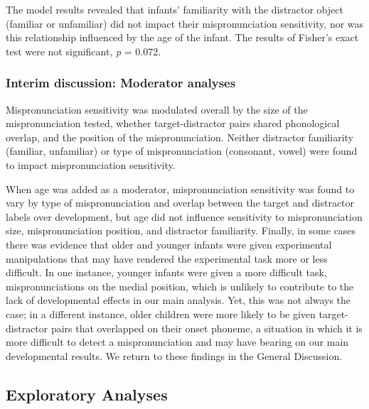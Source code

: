 \documentclass[
  english,
  man, noextraspace]{apa6}
\newenvironment{lltable}{\begin{landscape}\begin{center}\begin{ThreePartTable}}{\end{ThreePartTable}\end{center}\end{landscape}}
\begin{document}
\begin{lltable}
{}

\end{lltable}

The model results revealed that infants' familiarity with the distractor object (familiar or unfamiliar) did not impact their mispronunciation sensitivity, nor was this relationship influenced by the age of the infant. The results of Fisher's exact test were not significant, \emph{p} = 0.072.

\hypertarget{interim-discussion-moderator-analyses}{%
\subsubsection{Interim discussion: Moderator analyses}\label{interim-discussion-moderator-analyses}}

Mispronunciation sensitivity was modulated overall by the size of the mispronunciation tested, whether target-distractor pairs shared phonological overlap, and the position of the mispronunciation. Neither distractor familiarity (familiar, unfamiliar) or type of mispronunciation (consonant, vowel) were found to impact mispronunciation sensitivity.

When age was added as a moderator, mispronunciation sensitivity was found to vary by type of mispronunciation and overlap between the target and distractor labels over development, but age did not influence sensitivity to mispronunciation size, mispronunciation position, and distractor familiarity. Finally, in some cases there was evidence that older and younger infants were given experimental manipulations that may have rendered the experimental task more or less difficult. In one instance, younger infants were given a more difficult task, mispronunciations on the medial position, which is unlikely to contribute to the lack of developmental effects in our main analysis. Yet, this was not always the case; in a different instance, older children were more likely to be given target-distractor pairs that overlapped on their onset phoneme, a situation in which it is more difficult to detect a mispronunciation and may have bearing on our main developmental results. We return to these findings in the General Discussion.

\hypertarget{exploratory-analyses}{%
\subsection{Exploratory Analyses}\label{exploratory-analyses}}
\end{document}
